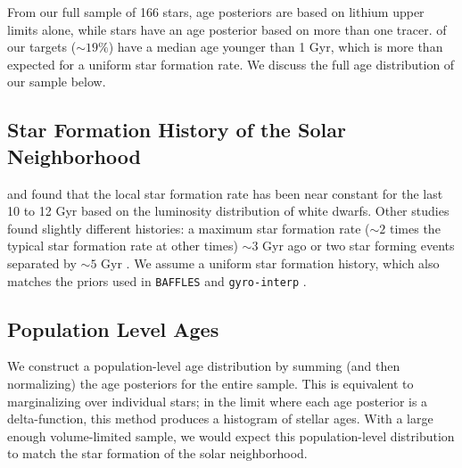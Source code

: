 From our full sample of 166 stars,  age posteriors are based on lithium upper limits alone, while  stars have an age posterior based on more than one tracer.  of our targets ($\sim19\%$) have a median age younger than 1 Gyr, which is more than expected for a uniform star formation rate. We discuss the full age distribution of our sample below.

\subsection{Star Formation History of the Solar Neighborhood}

 \cite{1990Ap&SS.163..229R} and \cite{2023MNRAS.522.1643C} found that the local star formation rate has been near constant for the last 10 to 12 Gyr based on the luminosity distribution of white dwarfs. Other studies found slightly different histories: a maximum star formation rate ($\sim2$ times the typical star formation rate at other times) $\sim3$ Gyr ago \citep{2006A&A...459..783C} or two star forming events separated by $\sim5$ Gyr \citep{2018Natur.559..585N}.  We assume a uniform star formation history, which also matches the priors used in \texttt{BAFFLES} \citep{2020ApJ...898...27S} and \texttt{gyro-interp} \citep{2023ApJ...947L...3B}.

\subsection{Population Level Ages}

 We construct a population-level age distribution by summing (and then normalizing) the age posteriors for the entire sample. This is equivalent to marginalizing over individual stars; in the limit where each age posterior is a delta-function, this method produces a histogram of stellar ages. With a large enough volume-limited sample, we would expect this population-level distribution to match the star formation of the solar neighborhood. 

